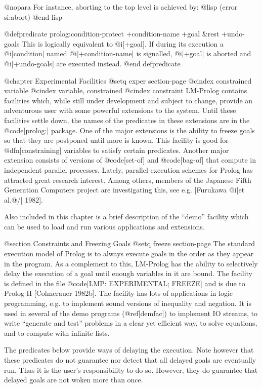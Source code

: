 {@nopara
For instance, aborting to the top level is achieved by:
@lisp
  (error si:abort)
@end lisp

@defpredicate prolog:condition-protect +condition-name +goal &rest +undo-goals
This is logically equivalent to @i[+goal].
If during its execution a @i[condition] named @i[+condition-name] is 
signalled, @i[+goal] is aborted and @i[+undo-goals] are executed instead.
@end defpredicate

@chapter Experimental Facilities
@setq exper section-page
@cindex constrained variable
@cindex variable, constrained
@cindex constraint
LM-Prolog contains facilities which, while still under development
and subject to change, provide an
adventurous user with some powerful extensions to the system.
Until these facilities settle down, the names of the predicates 
in these extensions are in the @code[prolog:] package.
One of the major extensions is the ability to freeze goals so that they are
postponed until more is known.
This facility is good for @dfn[constraining] variables to satisfy certain
predicates.
Another major extension consists of versions of
@code[set-of] and @code[bag-of] that
compute in independent parallel processes.
Lately, parallel execution schemes for Prolog has attracted great
research interest. Among others, members of the Japanese Fifth Generation
Computers project are investigating this, see e.g. 
[Furukawa @i[et al.@/] 1982].

Also included in this chapter is a brief description of the ``demo'' facility
which can be used to load and run various applications and extensions.

@section Constraints and Freezing Goals
@setq freeze section-page
The standard execution model of Prolog is to always execute goals
in the order as they appear in the program.
As a complement to this, LM-Prolog has the ability to selectively delay
the execution of a goal until enough variables in it are bound.
The facility is defined in the file @code[LMP: EXPERIMENTAL; FREEZE] and is
due to Prolog II [Colmerauer 1982b].
The facility has lots of applications in logic programming, e.g.
to implement sound versions of inequality and negation.
It is used in several of the demo programs (@ref[demfac]) to
implement IO streams, to write ``generate and test'' problems in
a clear yet efficient way, to solve equations, and to compute
with infinite lists.

The predicates below provide ways of delaying the execution.
Note however that these predicates do not guarantee nor detect that
all delayed goals are eventually run.  Thus it is the user's responsibility
to do so.  However, they do guarantee that delayed goals are not
woken more than once.

}

